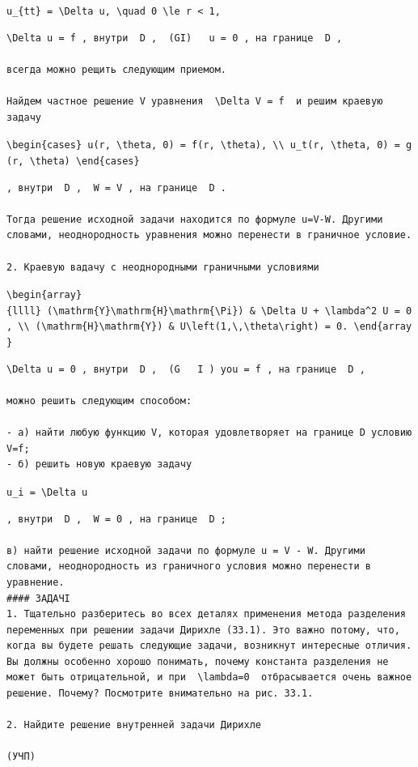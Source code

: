 \documentclass[
  ukrainian,
]{article}
\begin{document}
\texttt{u\_\{tt\}\ =\ \textbackslash{}Delta\ u,\ \textbackslash{}quad\ 0\ \textbackslash{}le\ r\ \textless{}\ 1,}

\begin{verbatim}
\Delta u = f , внутри  D ,  (GI)   u = 0 , на границе  D ,

всегда можно рещить следующим приемом.

Найдем частное решение V уравнения  \Delta V = f  и решим краевую задачу
\end{verbatim}

\texttt{\textbackslash{}begin\{cases\}\ u(r,\ \textbackslash{}theta,\ 0)\ =\ f(r,\ \textbackslash{}theta),\ \textbackslash{}\textbackslash{}\ u\_t(r,\ \textbackslash{}theta,\ 0)\ =\ g(r,\ \textbackslash{}theta)\ \textbackslash{}end\{cases\}}

\begin{verbatim}
, внутри  D ,  W = V , на границе  D .

Тогда решение исходной задачи находится по формуле u=V-W. Другими словами, неоднородность уравнения можно перенести в граничное условие.

2. Краевую вадачу с неоднородными граничными условиями
\end{verbatim}

\texttt{\textbackslash{}begin\{array\}\{llll\}\ (\textbackslash{}mathrm\{Y\}\textbackslash{}mathrm\{H\}\textbackslash{}mathrm\{\textbackslash{}Pi\})\ \&\ \textbackslash{}Delta\ U\ +\ \textbackslash{}lambda\^{}2\ U\ =\ 0,\ \textbackslash{}\textbackslash{}\ (\textbackslash{}mathrm\{H\}\textbackslash{}mathrm\{Y\})\ \&\ U\textbackslash{}left(1,\textbackslash{},\textbackslash{}theta\textbackslash{}right)\ =\ 0.\ \textbackslash{}end\{array\}}

\begin{verbatim}
\Delta u = 0 , внутри  D ,  (G   I ) you = f , на границе  D ,

можно решить следующим способом:

- а) найти любую функцию V, которая удовлетворяет на границе D условию V=f;
- б) решить новую краевую задачу
\end{verbatim}

\texttt{u\_i\ =\ \textbackslash{}Delta\ u}

\begin{verbatim}
, внутри  D ,  W = 0 , на границе  D ;

в) найти решение исходной задачи по формуле u = V - W. Другими словами, неоднородность из граничного условия можно перенести в уравнение.
#### ЗАДАЧІ
1. Тщательно разберитесь во всех деталях применения метода разделения переменных при решении задачи Дирихле (33.1). Это важно потому, что, когда вы будете решать следующие задачи, возникнут интересные отличия. Вы должны особенно хорошо понимать, почему константа разделения не может быть отрицательной, и при  \lambda=0  отбрасывается очень важное решение. Почему? Посмотрите внимательно на рис. 33.1.

2. Найдите решение внутренней задачи Дирихле

(УЧП)
\end{verbatim}
\end{document}
